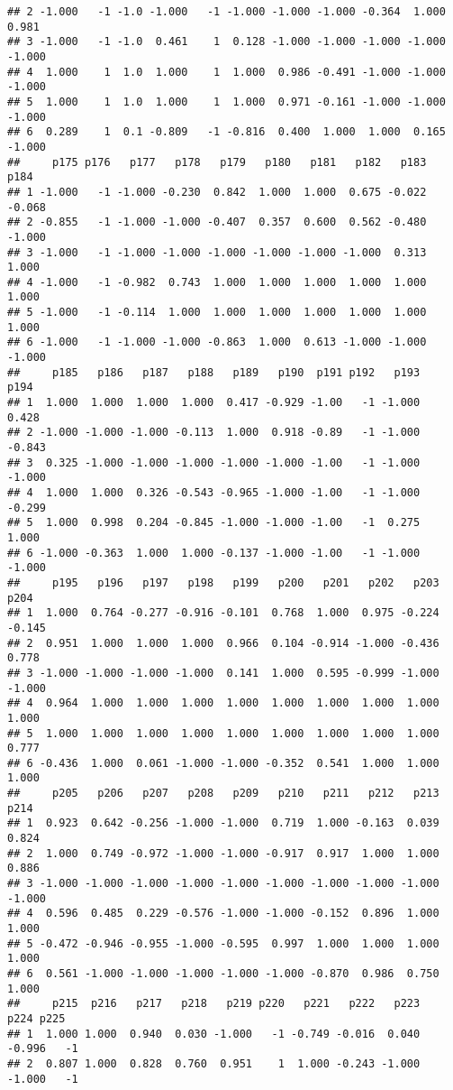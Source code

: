 \documentclass[]{article}
\begin{document}
\begin{verbatim}
## 2 -1.000   -1 -1.0 -1.000   -1 -1.000 -1.000 -1.000 -0.364  1.000  0.981
## 3 -1.000   -1 -1.0  0.461    1  0.128 -1.000 -1.000 -1.000 -1.000 -1.000
## 4  1.000    1  1.0  1.000    1  1.000  0.986 -0.491 -1.000 -1.000 -1.000
## 5  1.000    1  1.0  1.000    1  1.000  0.971 -0.161 -1.000 -1.000 -1.000
## 6  0.289    1  0.1 -0.809   -1 -0.816  0.400  1.000  1.000  0.165 -1.000
##     p175 p176   p177   p178   p179   p180   p181   p182   p183   p184
## 1 -1.000   -1 -1.000 -0.230  0.842  1.000  1.000  0.675 -0.022 -0.068
## 2 -0.855   -1 -1.000 -1.000 -0.407  0.357  0.600  0.562 -0.480 -1.000
## 3 -1.000   -1 -1.000 -1.000 -1.000 -1.000 -1.000 -1.000  0.313  1.000
## 4 -1.000   -1 -0.982  0.743  1.000  1.000  1.000  1.000  1.000  1.000
## 5 -1.000   -1 -0.114  1.000  1.000  1.000  1.000  1.000  1.000  1.000
## 6 -1.000   -1 -1.000 -1.000 -0.863  1.000  0.613 -1.000 -1.000 -1.000
##     p185   p186   p187   p188   p189   p190  p191 p192   p193   p194
## 1  1.000  1.000  1.000  1.000  0.417 -0.929 -1.00   -1 -1.000  0.428
## 2 -1.000 -1.000 -1.000 -0.113  1.000  0.918 -0.89   -1 -1.000 -0.843
## 3  0.325 -1.000 -1.000 -1.000 -1.000 -1.000 -1.00   -1 -1.000 -1.000
## 4  1.000  1.000  0.326 -0.543 -0.965 -1.000 -1.00   -1 -1.000 -0.299
## 5  1.000  0.998  0.204 -0.845 -1.000 -1.000 -1.00   -1  0.275  1.000
## 6 -1.000 -0.363  1.000  1.000 -0.137 -1.000 -1.00   -1 -1.000 -1.000
##     p195   p196   p197   p198   p199   p200   p201   p202   p203   p204
## 1  1.000  0.764 -0.277 -0.916 -0.101  0.768  1.000  0.975 -0.224 -0.145
## 2  0.951  1.000  1.000  1.000  0.966  0.104 -0.914 -1.000 -0.436  0.778
## 3 -1.000 -1.000 -1.000 -1.000  0.141  1.000  0.595 -0.999 -1.000 -1.000
## 4  0.964  1.000  1.000  1.000  1.000  1.000  1.000  1.000  1.000  1.000
## 5  1.000  1.000  1.000  1.000  1.000  1.000  1.000  1.000  1.000  0.777
## 6 -0.436  1.000  0.061 -1.000 -1.000 -0.352  0.541  1.000  1.000  1.000
##     p205   p206   p207   p208   p209   p210   p211   p212   p213   p214
## 1  0.923  0.642 -0.256 -1.000 -1.000  0.719  1.000 -0.163  0.039  0.824
## 2  1.000  0.749 -0.972 -1.000 -1.000 -0.917  0.917  1.000  1.000  0.886
## 3 -1.000 -1.000 -1.000 -1.000 -1.000 -1.000 -1.000 -1.000 -1.000 -1.000
## 4  0.596  0.485  0.229 -0.576 -1.000 -1.000 -0.152  0.896  1.000  1.000
## 5 -0.472 -0.946 -0.955 -1.000 -0.595  0.997  1.000  1.000  1.000  1.000
## 6  0.561 -1.000 -1.000 -1.000 -1.000 -1.000 -0.870  0.986  0.750  1.000
##     p215  p216   p217   p218   p219 p220   p221   p222   p223   p224 p225
## 1  1.000 1.000  0.940  0.030 -1.000   -1 -0.749 -0.016  0.040 -0.996   -1
## 2  0.807 1.000  0.828  0.760  0.951    1  1.000 -0.243 -1.000 -1.000   -1

\end{verbatim}
\end{document}
